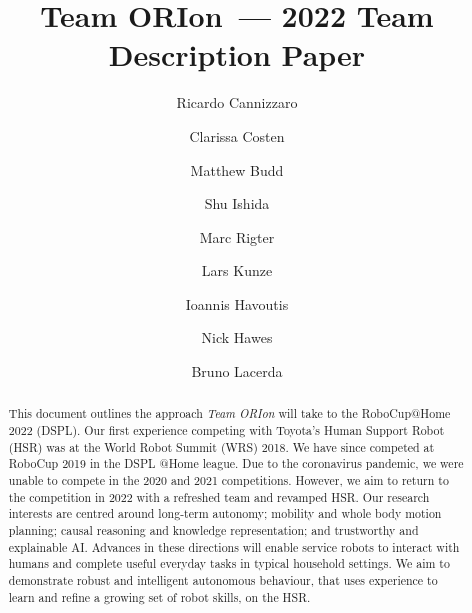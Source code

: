 \documentclass[runningheads,a4paper]{llncs}
\newcommand{\teamori}{Team ORIon}
\begin{document}

\title{\teamori\ --- 2022 Team Description Paper}

\author{Ricardo Cannizzaro \and Clarissa Costen \and Matthew Budd \and Shu Ishida \and Marc Rigter \and Lars Kunze \and Ioannis Havoutis \and Nick Hawes \and Bruno Lacerda}

\maketitle


\begin{abstract}
This document outlines the approach \textit{\teamori} will take to the RoboCup@Home 2022 (DSPL).
Our first experience competing with Toyota's Human Support Robot (HSR) was at the World Robot Summit (WRS) 2018. We have since competed at RoboCup 2019 in the DSPL @Home league. Due to the coronavirus pandemic, we were unable to compete in the 2020 and 2021 competitions. However, we aim to return to the competition in 2022 with a refreshed team and revamped HSR.
Our research interests are centred around long-term autonomy; mobility and whole body motion planning; causal reasoning and knowledge representation; and trustworthy and explainable AI.
Advances in these directions will enable service robots to interact with humans and complete useful everyday tasks in typical household settings. 
We aim to demonstrate robust and intelligent autonomous behaviour, that uses experience to learn and refine a growing set of robot skills, on the HSR.
\end{abstract}



\end{document}
